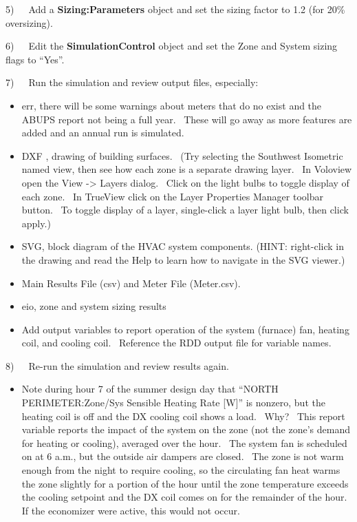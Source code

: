 5)~~~Add a \textbf{Sizing:Parameters} object and set the sizing factor to 1.2 (for 20\% oversizing).

6)~~~Edit the \textbf{SimulationControl} object and set the Zone and System sizing flags to ``Yes''.

7)~~~Run the simulation and review output files, especially:

\begin{itemize}
\item
  err, there will be some warnings about meters that do no exist and the ABUPS report not being a full year.~ These will go away as more features are added and an annual run is simulated.
\item
  DXF , drawing of building surfaces.~ (Try selecting the Southwest Isometric named view, then see how each zone is a separate drawing layer.~ In Voloview open the View -\textgreater{} Layers dialog.~ Click on the light bulbs to toggle display of each zone.~ In TrueView click on the Layer Properties Manager toolbar button.~ To toggle display of a layer, single-click a layer light bulb, then click apply.)
\item
  SVG, block diagram of the HVAC system components. (HINT: right-click in the drawing and read the Help to learn how to navigate in the SVG viewer.)
\item
  Main Results File (csv) and Meter File (Meter.csv).
\item
  eio, zone and system sizing results
\item
  Add output variables to report operation of the system (furnace) fan, heating coil, and cooling coil.~ Reference the RDD output file for variable names.
\end{itemize}

8)~~~Re-run the simulation and review results again.

\begin{itemize}
\tightlist
\item
  Note during hour 7 of the summer design day that ``NORTH PERIMETER:Zone/Sys Sensible Heating Rate {[}W{]}'' is nonzero, but the heating coil is off and the DX cooling coil shows a load.~ Why?~ This report variable reports the impact of the system on the zone (not the zone's demand for heating or cooling), averaged over the hour.~ The system fan is scheduled on at 6 a.m., but the outside air dampers are closed.~ The zone is not warm enough from the night to require cooling, so the circulating fan heat warms the zone slightly for a portion of the hour until the zone temperature exceeds the cooling setpoint and the DX coil comes on for the remainder of the hour.~ If the economizer were active, this would not occur.
\end{itemize}


